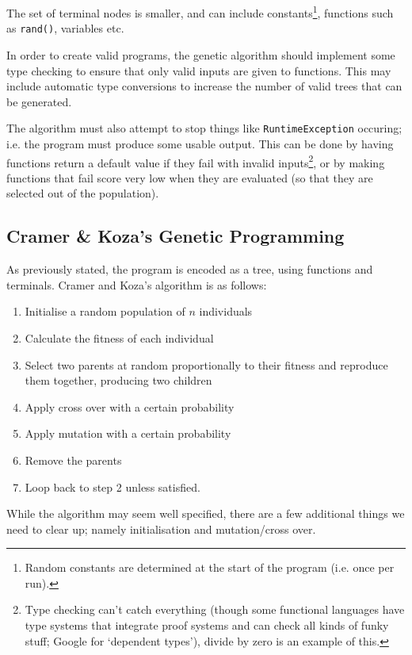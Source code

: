 The set of terminal nodes is smaller, and can include
constants\footnote{Random constants are determined at the start of the
program (i.e. once per run).}, functions such as \texttt{rand()},
variables etc.

In order to create valid programs, the genetic algorithm should
implement some type checking to ensure that only valid inputs are
given to functions. This may include automatic type conversions to
increase the number of valid trees that can be generated.

The algorithm must also attempt to stop things
like \texttt{RuntimeException} occuring; i.e. the program must produce
some usable output. This can be done by having functions return a
default value if they fail with invalid inputs\footnote{Type checking
can't catch everything (though some functional languages have type
systems that integrate proof systems and can check all kinds of funky
stuff; Google for `dependent types'), divide by zero is an example of
this.}, or by making functions that fail score very low when they are
evaluated (so that they are selected out of the population).

\subsection{Cramer \& Koza's Genetic Programming}

As previously stated, the program is encoded as a tree, using
functions and terminals. Cramer and Koza's algorithm is as follows:

\begin{enumerate}
\item Initialise a random population of $n$ individuals
\item Calculate the fitness of each individual
\item Select two parents at random proportionally to their fitness and
reproduce them together, producing two children
\item Apply cross over with a certain probability
\item Apply mutation with a certain probability
\item Remove the parents
\item Loop back to step 2 unless satisfied.
\end{enumerate}

While the algorithm may seem well specified, there are a few
additional things we need to clear up; namely initialisation and
mutation/cross over.

